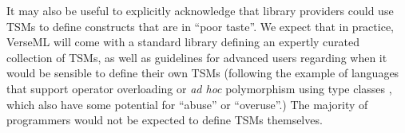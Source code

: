 It may also be useful to explicitly acknowledge that library providers could use TSMs  to define constructs that are in ``poor taste''. We  expect that in practice, VerseML will come with a standard library defining an expertly curated collection of TSMs, as well as guidelines for advanced users regarding when it would be sensible to define their own TSMs (following the example of languages that support operator overloading or \emph{ad hoc} polymorphism using type classes \cite{Hall:1996:TCH:227699.227700,conf/popl/DreyerHCK07}, which also have some potential for ``abuse'' or ``overuse''.) %
The majority of programmers would not be expected to define TSMs themselves.

